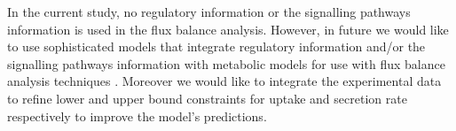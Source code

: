 \documentclass[12pt]{article}
\begin{document}

In the current study, no regulatory information or the signalling pathways information is used in the flux balance analysis. However, in future we would like to use sophisticated models that integrate regulatory information and/or the signalling pathways information with metabolic models for use with flux balance analysis techniques \cite{CovertPalsson2002,Covertetal2008}. Moreover we would like to integrate the experimental data \cite{Brandesetal2012} to refine lower and upper bound constraints for uptake and secretion rate respectively to improve the model's predictions.
\end{document}
